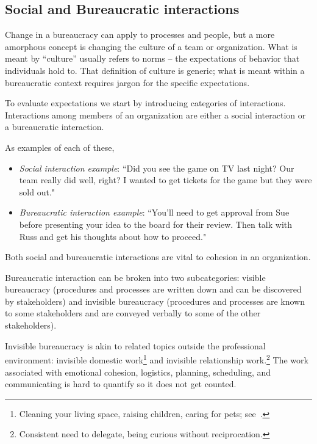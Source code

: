 
\subsection*{Social and Bureaucratic interactions\label{sec:socializing}}

Change in a bureaucracy can apply to processes and people, but a more amorphous concept is changing the culture of a team or organization. What is meant by ``culture'' usually refers to norms -- the expectations of behavior that individuals hold to. That definition of culture is generic; what is meant within a bureaucratic context requires jargon for the specific expectations.

To evaluate expectations we start by introducing categories of interactions. 
Interactions among members of an organization are either a social interaction or a bureaucratic interaction. 

As examples of each of these,
\begin{itemize}
\item \textit{Social interaction example}: ``Did you see the game on TV last night? Our team really did well, right? I wanted to get tickets for the game but they were sold out."
\item \textit{Bureaucratic interaction example}: ``You'll need to get approval from Sue before presenting your idea to the board for their review. Then talk with Russ and get his thoughts about how to proceed."
\end{itemize}
Both social and bureaucratic interactions are vital to cohesion in an organization. 


Bureaucratic interaction can be broken into two subcategories: 
\gls{visible bureaucracy} \iftoggle{glossaryinmargin}{\marginpar{[Glossary]}}{}
(procedures and processes are written down and can be discovered by stakeholders) and 
\gls{invisible bureaucracy} \iftoggle{glossaryinmargin}{\marginpar{[Glossary]}}{}
(procedures and processes are known to some stakeholders and are conveyed verbally to some of the other stakeholders).

Invisible bureaucracy is akin to related topics outside the professional environment: invisible domestic work\footnote{Cleaning your living space, raising children, caring for pets; see~\cite{1987_Daniels}.} and invisible relationship work.\footnote{Consistent need to delegate, being curious without reciprocation.} The work associated with emotional cohesion, logistics, planning, scheduling, and communicating is hard to quantify so it does not get counted.


